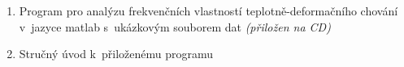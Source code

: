 \begin{enumerate}[leftmargin=*, itemsep=0.5\baselineskip, parsep=0pt]
\item Program pro analýzu frekvenčních vlastností teplotně-deformačního chování v~jazyce matlab s~ukázkovým souborem dat \textit{(přiložen na CD)}
\item Stručný úvod k~přiloženému programu
\end{enumerate} 